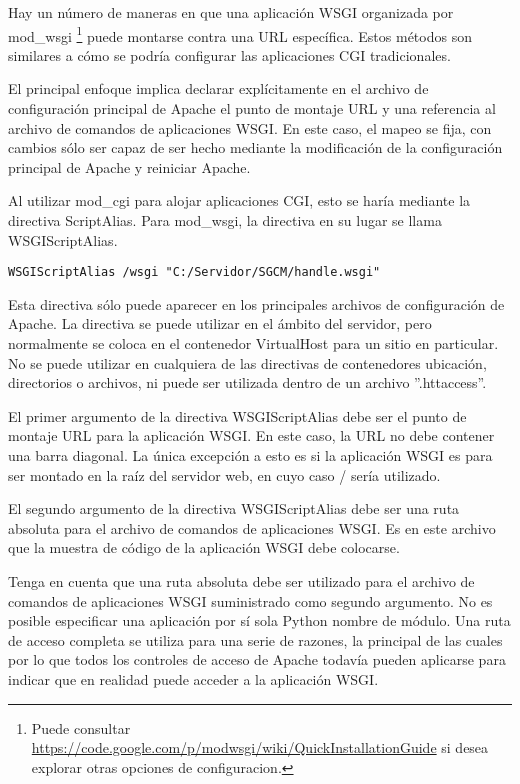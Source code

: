 Hay un número de maneras en que una aplicación WSGI organizada por mod\_wsgi
\footnote{Puede consultar \url{https://code.google.com/p/modwsgi/wiki/QuickInstallationGuide}
si desea explorar otras opciones de configuracion.}
puede montarse contra una URL específica. Estos métodos son similares a cómo se
podría configurar las aplicaciones CGI tradicionales.

El principal enfoque implica declarar explícitamente en el archivo de
configuración principal de Apache el punto de montaje URL y una referencia al
archivo de comandos de aplicaciones WSGI. En este caso, el mapeo se fija,
con cambios sólo ser capaz de ser hecho mediante la modificación de la
configuración principal de Apache y reiniciar Apache.

Al utilizar mod\_cgi para alojar aplicaciones CGI, esto se haría mediante la
directiva ScriptAlias. Para mod\_wsgi, la directiva en su lugar se
llama WSGIScriptAlias.

\begin{lstlisting}[style=consola]
WSGIScriptAlias /wsgi "C:/Servidor/SGCM/handle.wsgi" 
\end{lstlisting}
\vspace{0.1cm}

Esta directiva s\'olo puede aparecer en los principales archivos de configuración
de Apache. La directiva se puede utilizar en el ámbito del servidor, pero
normalmente se coloca en el contenedor VirtualHost para un sitio en particular.
No se puede utilizar en cualquiera de las directivas de contenedores ubicación,
directorios o archivos, ni puede ser utilizada dentro de un archivo ''.httaccess''.

El primer argumento de la directiva WSGIScriptAlias debe ser el punto de montaje
URL para la aplicación WSGI. En este caso, la URL no debe contener una barra
diagonal. La única excepción a esto es si la aplicación WSGI es para ser
montado en la raíz del servidor web, en cuyo caso / sería utilizado.

El segundo argumento de la directiva WSGIScriptAlias debe ser una ruta absoluta
para el archivo de comandos de aplicaciones WSGI. Es en este archivo que la
muestra de código de la aplicación WSGI debe colocarse.

Tenga en cuenta que una ruta absoluta debe ser utilizado para el archivo de
comandos de aplicaciones WSGI suministrado como segundo argumento. No es posible
especificar una aplicación por sí sola Python nombre de módulo. Una ruta de
acceso completa se utiliza para una serie de razones, la principal de las
cuales por lo que todos los controles de acceso de Apache todavía pueden aplicarse
para indicar que en realidad puede acceder a la aplicación WSGI.

